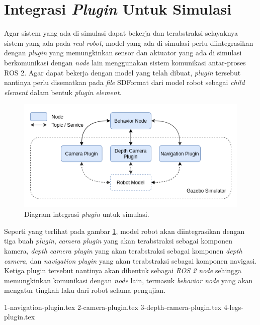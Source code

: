 \section{Integrasi \emph{Plugin} Untuk Simulasi}
\label{sec:integrasiplugin}

Agar sistem yang ada di simulasi dapat bekerja dan terabstraksi selayaknya sistem yang ada pada \emph{real robot},
  model yang ada di simulasi perlu diintegrasikan dengan \emph{plugin} yang memungkinkan sensor dan aktuator yang ada di simulasi berkomunikasi dengan \emph{node} lain menggunakan sistem komunikasi antar-proses ROS 2.
  Agar dapat bekerja dengan model yang telah dibuat, \emph{plugin} tersebut nantinya perlu disematkan pada \emph{file} SDFormat dari model robot sebagai \emph{child element} dalam bentuk \emph{plugin element}.

\begin{figure} [ht]
  \centering
  \includegraphics[scale=0.5]{gambar/integrasi-plugin-simulasi.png}
  \caption{Diagram integrasi \emph{plugin} untuk simulasi.}
  \label{fig:integrasipluginsimulasi}
\end{figure}

Seperti yang terlihat pada gambar \ref{fig:integrasipluginsimulasi},
  model robot akan diintegrasikan dengan tiga buah \emph{plugin},
  \emph{camera plugin} yang akan terabstraksi sebagai komponen kamera,
  \emph{depth camera plugin} yang akan terabstraksi sebagai komponen \emph{depth camera},
  dan \emph{navigation plugin} yang akan terabstraksi sebagai komponen navigasi.
Ketiga plugin tersebut nantinya akan dibentuk sebagai \emph{ROS 2 node} sehingga memungkinkan komunikasi dengan \emph{node} lain,
  termasuk \emph{behavior node} yang akan mengatur tingkah laku dari robot selama pengujian.

{1-navigation-plugin.tex}
{2-camera-plugin.tex}
{3-depth-camera-plugin.tex}
{4-legs-plugin.tex}
